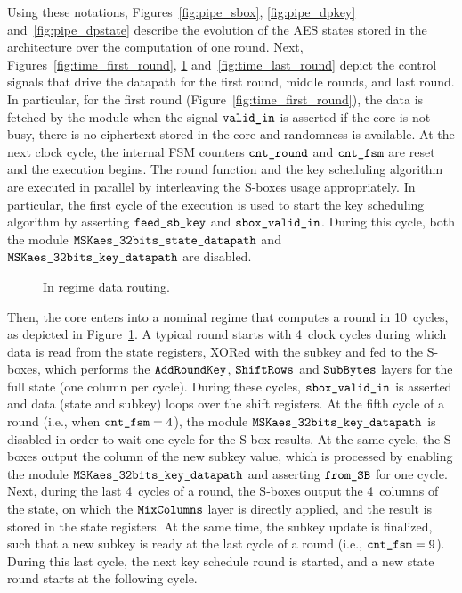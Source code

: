 \documentclass{scrartcl}
\begin{document}
Using these notations, Figures~\ref{fig:pipe_sbox}, \ref{fig:pipe_dpkey}
and~\ref{fig:pipe_dpstate} describe the evolution of the AES states stored in
the architecture over the computation of one round.
Next, Figures~\ref{fig:time_first_round}, \ref{fig:time_regime}
and~\ref{fig:time_last_round} depict the control signals that drive the
datapath for the first round, middle rounds, and last round.
In particular, for the first round (Figure~\ref{fig:time_first_round}), the
data is fetched by the module when the signal $\texttt{valid\_in}$ is asserted if
the core is not busy, there is no ciphertext stored in the core and randomness
is available.
At the next clock cycle, the
internal FSM counters $\texttt{cnt\_round}$ and $\texttt{cnt\_fsm}$ are reset and the
execution begins. The round function and the key scheduling algorithm are
executed in parallel by interleaving the S-boxes usage appropriately. In
particular, the first cycle of the execution is used to start the key
scheduling algorithm by asserting $\texttt{feed\_sb\_key}$ and $\texttt{sbox\_valid\_in}$.
During this cycle, both the module $\texttt{MSKaes\_32bits\_state\_datapath}$ and $\texttt{MSKaes\_32bits\_key\_datapath}$ are
disabled.

\begin{figure}
    \centering
     
    \caption{In regime data routing.}
    \label{fig:time_regime}
\end{figure}

Then, the core enters into a nominal regime that computes a round in 10~cycles,
as depicted in Figure~\ref{fig:time_regime}.
A typical round starts with 4~clock cycles during which data is read from the
state registers, XORed with the subkey and fed to the S-boxes, which performs
the $\texttt{AddRoundKey}$, $\texttt{ShiftRows}$ and $\texttt{SubBytes}$ layers for the full state (one column per cycle).
During these cycles, $\texttt{sbox\_valid\_in}$ is asserted and data (state and subkey)
loops over the shift registers.
At the fifth cycle of a round (i.e., when $\texttt{cnt\_fsm}=4$), the module
$\texttt{MSKaes\_32bits\_key\_datapath}$ is disabled in order to wait one cycle for the S-box results.
At the same cycle, the S-boxes output the column of the new subkey value, which is
processed by enabling the module $\texttt{MSKaes\_32bits\_key\_datapath}$ and asserting
$\texttt{from\_SB}$ for one cycle.
Next, during the last 4~cycles of a round, the
S-boxes output the 4~columns of the state, on which the $\texttt{MixColumns}$ layer is directly
applied, and the result is stored in the state registers.
At the same time, the subkey update is finalized, such that a new subkey is
ready at the last cycle of a round (i.e., $\texttt{cnt\_fsm}=9$).
During this last cycle, the next key schedule round is started, and a new state
round starts at the following cycle. 
\end{document}
